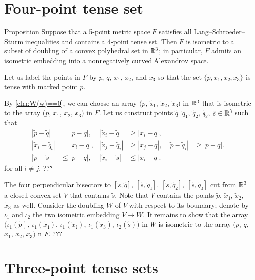 \documentclass{article}
\begin{document}
\section{Four-point tense set}\label{sec:4-tense}

\begin{thm}{Proposition}
Suppose that a 5-point metric space $F$ satisfies all Lang--Schroeder--Sturm inequalities and contains a 4-point tense set.
Then $F$ is isometric to a subset of doubling of a convex polyhedral set in $\mathbb{R}^3$;
in particular, $F$ admits an isometric embedding into a nonnegatively curved Alexandrov space.
\end{thm}

Let us label the points in $F$ by $p$, $q$, $x_1$, $x_2$, and $x_3$ so that the set $\{p,x_1,x_2,x_3\}$ is tense with marked point $p$.

By \ref{clm:W(w)==0}, we can choose an array $(\tilde p$, $\tilde x_1$, $\tilde x_2$, $\tilde x_3)$ in $\mathbb{R}^3$ that is isometric to the array $(p$, $x_1$, $x_2$, $x_3)$ in $F$.
Let us construct points $\tilde q$, $\tilde q_1$, $\tilde q_2$, $\tilde q_3$, $\tilde s\in\mathbb{R}^3$ such that
\begin{align*}
|\tilde p-\tilde q|&=|p-q|,
&
|\tilde x_i-\tilde q|&\ge|x_i-q|,
\\
|\tilde x_i-\tilde q_i|&=|x_i-q|,
&
|\tilde x_j-\tilde q_i|&\ge|x_j-q|,
&
|\tilde p-\tilde q_i|&\ge |p-q|.
\\
|\tilde p-\tilde s|&\le|p-q|,
&
|\tilde x_i-\tilde s|&\le|x_i-q|.
\end{align*}
for all $i\ne j$.
???

The four perpendicular bisectors to 
$[\tilde s, \tilde q]$, 
$[\tilde s, \tilde q_1]$, 
$[\tilde s, \tilde q_2]$, 
$[\tilde s, \tilde q_3]$ cut from $\mathbb{R}^3$ a closed convex set $V$ that contains $\tilde s$.
Note that $V$ contains the points $\tilde p$, $\tilde x_1$, $\tilde x_2$, $\tilde x_3$ as well.
Consider the doubling $W$ of $V$ with respect to its boundary;
denote by $\iota_1$ and $\iota_2$ the two isometric embedding $V\to W$.
It remains to show that the array $(\iota_1(\tilde p)$, $\iota_1(\tilde x_1)$, $\iota_1(\tilde x_2)$, $\iota_1(\tilde x_3)$,  $\iota_2(\tilde s))$ in $W$ is isometric to the array $(p$, $q$, $x_1$, $x_2$, $x_3)$ n $F$.
???
\qeds


\section{Three-point tense sets}\label{sec:3-tense}
\end{document}
